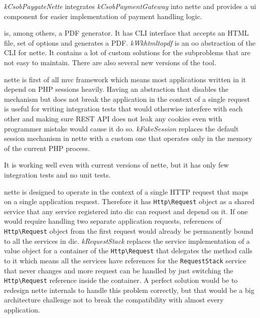  \label{sec:state:csob-paygate-nette}

\textit{\gls{kCsobPaygateNette}} integrates \textit{\gls{kCsobPaymentGateway}} into \gls{nette} and provides a \gls{ui} component for easier implementation of payment handling logic.

 \label{sec:state:wkhtmltopdf}

 is, among others, a PDF generator. It has CLI interface that accepts an HTML file, set of options and generates a PDF. \textit{\gls{kWkhtmltopdf}} is an \gls{oo} abstraction of the CLI for \gls{nette}. It contains a lot of custom solutions for the subproblems that are not easy to maintain. There are also several new versions of the tool.

 \label{sec:state:fake-session}

\gls{nette} is first of all \gls{mvc} framework which means most applications written in it depend on PHP sessions heavily. Having an abstraction that disables the mechanism but does not break the application in the context of a single request is useful for writing integration tests that would otherwise interfere with each other and making sure REST API does not leak any cookies even with programmer mistake would cause it do so. \textit{\gls{kFakeSession}} replaces the default session mechanism in \gls{nette} with a custom one that operates only in the memory of the current PHP process.

It is working well even with current versions of \gls{nette}, but it has only few integration tests and no unit tests.

 \label{sec:state:request-stack}

\gls{nette} is designed to operate in the context of a single HTTP request that maps on a single application request. Therefore it has \lstinline{Http\Request} object as a shared service that any service registered into \gls{dic} can request and depend on it. If one would require handling two separate application requests, references of \lstinline{Http\Request} object from the first request would already be permanently bound to all the services in \gls{dic}. \textit{\gls{kRequestStack}} replaces the service implementation of a value object for a container of the \lstinline{Http\Request} that delegates the method calls to it which means all the services have references for the \lstinline{RequestStack} service that never changes and more request can be handled by just switching the \lstinline{Http\Request} reference inside the container. A perfect solution would be to redesign \gls{nette} internals to handle this problem correctly, but that would be a big architecture challenge not to break the compatibility with almost every application.


